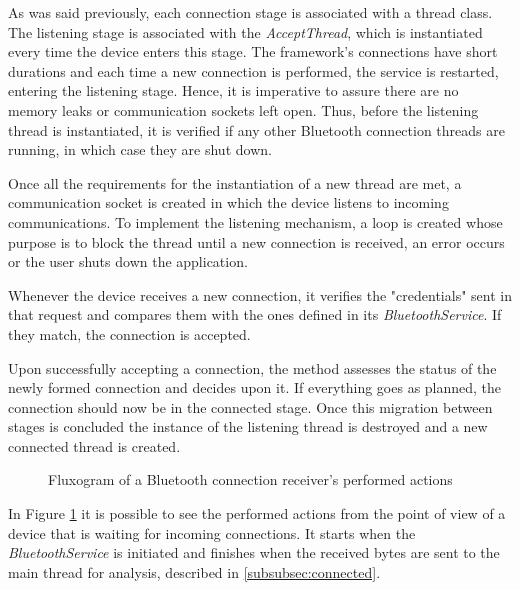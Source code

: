 As was said previously, each connection stage is associated with a thread class. The listening stage is associated with the \textit{AcceptThread}, which is instantiated every time the device enters this stage. The framework's connections have short durations and each time a new connection is performed, the service is restarted, entering the listening stage. Hence, it is imperative to assure there are no memory leaks or communication sockets left open. Thus, before the listening thread is instantiated, it is verified if any other Bluetooth connection threads are running, in which case they are shut down.

Once all the requirements for the instantiation of a new thread are met, a communication socket is created in which the device listens to incoming communications. To implement the listening mechanism, a loop is created whose purpose is to block the thread until a new connection is received, an error occurs or the user shuts down the application.

Whenever the device receives a new connection, it verifies the "credentials" sent in that request and compares them with the ones defined in its \textit{BluetoothService}. If they match, the connection is accepted.

Upon successfully accepting a connection, the method assesses the status of the newly formed connection and decides upon it. If everything goes as planned, the connection should now be in the connected stage. Once this migration between stages is concluded the instance of the listening thread is destroyed and a new connected thread is created.

\begin{figure}[ht]
	\noindent{}
	\caption{\label{fig:btreceiver} Fluxogram of a Bluetooth connection receiver's performed actions}
\end{figure}

In Figure \ref{fig:btreceiver} it is possible to see the performed actions from the point of view of a device that is waiting for incoming connections. It starts when the \textit{BluetoothService} is initiated and finishes when the received bytes are sent to the main thread for analysis, described in \ref{subsubsec:connected}.

